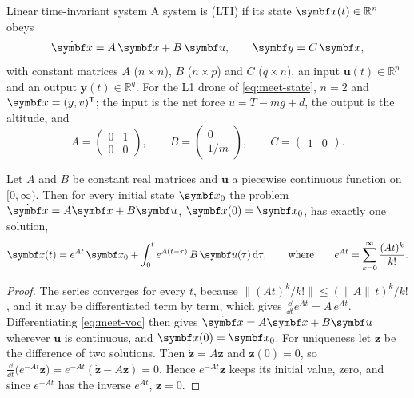 \begin{definition}{Linear time-invariant system}
A system is  (LTI) if its state $\vx(t) \in \mathbb{R}^n$ obeys
\begin{equation}\label{eq:meet-lti}
  \dot{\vx} = A\,\vx + B\,\symbf u, \qquad \symbf y = C\,\vx ,
\end{equation}
with constant matrices $A$ ($n \times n$), $B$ ($n \times p$) and $C$ ($q \times n$), an input $\symbf u(t) \in \mathbb{R}^p$ and an output $\symbf y(t) \in \mathbb{R}^q$. For the L1 drone of \cref{eq:meet-state}, $n = 2$ and $\vx = (y, v)^\T$; the input is the net force $u = T - mg + d$, the output is the altitude, and
\begin{equation*}
  A = \begin{pmatrix} 0 & 1 \\ 0 & 0 \end{pmatrix}, \qquad
  B = \begin{pmatrix} 0 \\ 1/m \end{pmatrix}, \qquad
  C = \begin{pmatrix} 1 & 0 \end{pmatrix}.
\end{equation*}
\end{definition}

\begin{theorem}
\label{thm:meet-solution}
Let $A$ and $B$ be constant real matrices and $\symbf u$ a piecewise continuous function on $[0, \infty)$. Then for every initial state $\vx_0$ the problem $\dot{\vx} = A\vx + B\symbf u$, $\vx(0) = \vx_0$, has exactly one solution,
\begin{equation}\label{eq:meet-voc}
  \vx(t) = e^{At}\,\vx_0 + \int_0^t e^{A(t - \tau)}\,B\,\symbf u(\tau)\,\dd\tau ,
  \qquad\text{where}\qquad e^{At} = \sum_{k=0}^{\infty} \frac{(At)^k}{k!} .
\end{equation}
\end{theorem}
\begin{proof}
The series converges for every $t$, because $\|(At)^k/k!\| \le (\|A\|\,t)^k/k!$, and it may be differentiated term by term, which gives $\frac{\dd}{\dd t}e^{At} = A\,e^{At}$. Differentiating \cref{eq:meet-voc} then gives $\dot{\vx} = A\vx + B\symbf u$ wherever $\symbf u$ is continuous, and $\vx(0) = \vx_0$. For uniqueness let $\symbf z$ be the difference of two solutions. Then $\dot{\symbf z} = A\symbf z$ and $\symbf z(0) = 0$, so $\frac{\dd}{\dd t}\big(e^{-At}\symbf z\big) = e^{-At}(\dot{\symbf z} - A\symbf z) = 0$. Hence $e^{-At}\symbf z$ keeps its initial value, zero, and since $e^{-At}$ has the inverse $e^{At}$, $\symbf z = 0$.
\end{proof}

